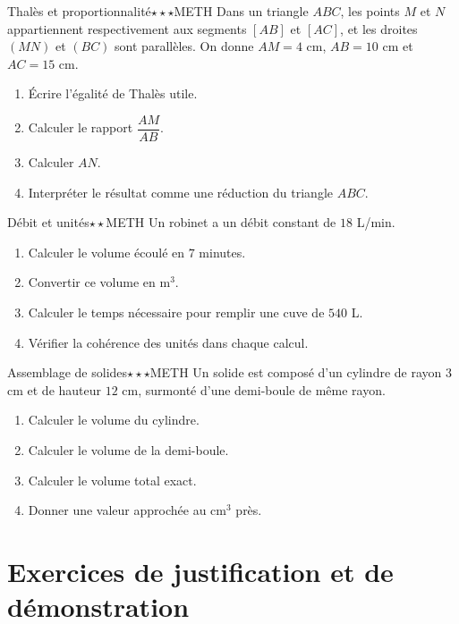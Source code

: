 \documentclass[11pt,a4paper]{article}
\newcounter{exo}
\begin{document}
\begin{exobox}{Thalès et proportionnalité}{$\star\star\star$}{METH}
Dans un triangle $ABC$, les points $M$ et $N$ appartiennent respectivement aux segments $[AB]$ et $[AC]$, et les droites $(MN)$ et $(BC)$ sont parallèles. On donne $AM=4$ cm, $AB=10$ cm et $AC=15$ cm.
\begin{enumerate}
\item Écrire l'égalité de Thalès utile.
\item Calculer le rapport $\dfrac{AM}{AB}$.
\item Calculer $AN$.
\item Interpréter le résultat comme une réduction du triangle $ABC$.
\end{enumerate}
\end{exobox}

\begin{exobox}{Débit et unités}{$\star\star$}{METH}
Un robinet a un débit constant de $18$ L/min.
\begin{enumerate}
\item Calculer le volume écoulé en $7$ minutes.
\item Convertir ce volume en m$^3$.
\item Calculer le temps nécessaire pour remplir une cuve de $540$ L.
\item Vérifier la cohérence des unités dans chaque calcul.
\end{enumerate}
\end{exobox}

\begin{exobox}{Assemblage de solides}{$\star\star\star$}{METH}
Un solide est composé d'un cylindre de rayon $3$ cm et de hauteur $12$ cm, surmonté d'une demi-boule de même rayon.
\begin{enumerate}
\item Calculer le volume du cylindre.
\item Calculer le volume de la demi-boule.
\item Calculer le volume total exact.
\item Donner une valeur approchée au cm$^3$ près.
\end{enumerate}
\end{exobox}

\section{Exercices de justification et de démonstration}
\end{document}
